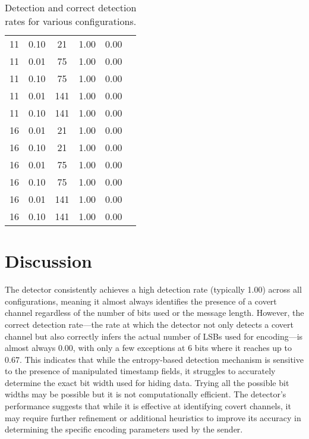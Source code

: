 \documentclass[10pt,a4paper]{article}
\begin{document}
\begin{table}[H]
\begin{tabular}{cccccc}
11 & 0.10 & 21  & 1.00 & 0.00 \\
11 & 0.01 & 75  & 1.00 & 0.00 \\
11 & 0.10 & 75  & 1.00 & 0.00 \\
11 & 0.01 & 141 & 1.00 & 0.00 \\
11 & 0.10 & 141 & 1.00 & 0.00 \\
16 & 0.01 & 21  & 1.00 & 0.00 \\
16 & 0.10 & 21  & 1.00 & 0.00 \\
16 & 0.01 & 75  & 1.00 & 0.00 \\
16 & 0.10 & 75  & 1.00 & 0.00 \\
16 & 0.01 & 141 & 1.00 & 0.00 \\
16 & 0.10 & 141 & 1.00 & 0.00 \\
\bottomrule
\end{tabular}
\caption{Detection and correct detection rates for various configurations.}
\end{table}


\section*{Discussion}
The detector consistently achieves a high detection rate (typically 1.00) across all configurations, meaning it almost always identifies the presence of a covert channel regardless of the number of bits used or the message length. 
However, the correct detection rate—the rate at which the detector not only detects a covert channel but also correctly infers the actual number of LSBs used for encoding—is almost always 0.00, with only a few exceptions at 6 bits where it reaches up to 0.67. 
This indicates that while the entropy-based detection mechanism is sensitive to the presence of manipulated timestamp fields, it struggles to accurately determine the exact bit width used for hiding data. 
Trying all the possible bit widths may be possible but it is not computationally efficient.
The detector's performance suggests that while it is effective at identifying covert channels, it may require further refinement or additional heuristics to improve its accuracy in determining the specific encoding parameters used by the sender.
\end{document}
